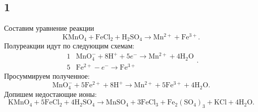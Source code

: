 \subsection{1}

Составим уравнение реакции
\[
\mathrm{KMnO_4}+\mathrm{FeCl_2}+\mathrm{H_2SO_4}\longrightarrow\mathrm{Mn^{2+}}+\mathrm{Fe^{3+}}.
\]
Полуреакции идут по следующим схемам:
\[
\begin{array}{r|l}
	1 & \mathrm{MnO_4^{-}}+8\mathrm{H^+}+5e^-\longrightarrow\mathrm{Mn^{2+}}+4\mathrm{H_2O} \\
	5 & \mathrm{Fe^{2+}}-e^-\longrightarrow\mathrm{Fe^{3+}}
\end{array}.
\]
Просуммируем полученное:
\[
\mathrm{MnO_4^{-}}+5\mathrm{Fe^{2+}}+8\mathrm{H^+}\longrightarrow\mathrm{Mn^{2+}}+5\mathrm{Fe^{3+}}
+4\mathrm{H_2O}.
\]
Допишем недостающие ионы:
\[
\mathrm{KMnO_4}+5\mathrm{FeCl_2}+4\mathrm{H_2SO_4}\longrightarrow\mathrm{MnSO_4}+3\mathrm{FeCl_3}+\mathrm{Fe_2(SO_4)_3}+\mathrm{KCl}
+4\mathrm{H_2O}.
\]